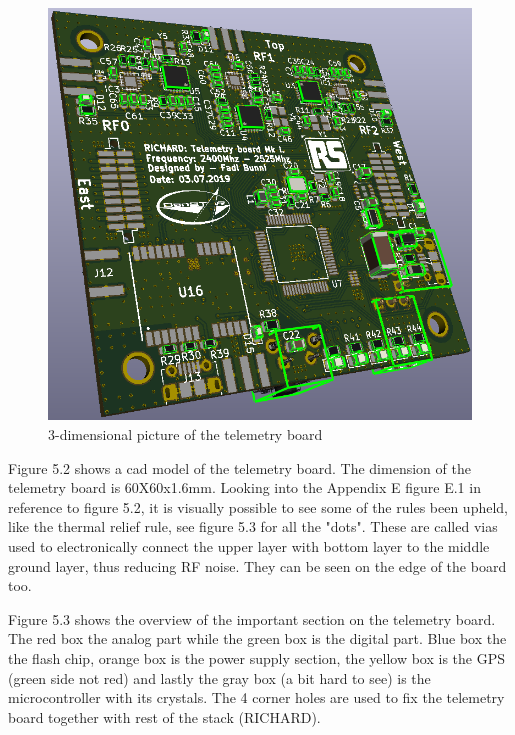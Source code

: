 \begin{figure}[h!]
\centering
\includegraphics[scale=0.8]{figures/TelemetryBoard3D.PNG}
\caption{3-dimensional picture of the telemetry board}
\end{figure}

Figure 5.2 shows a cad model of the telemetry board. The dimension of the telemetry board is 60X60x1.6mm. Looking into the Appendix E figure E.1 in reference to figure 5.2, it is visually possible to see some of the rules been upheld, like the thermal relief rule, see figure 5.3 for all the "dots". These are called vias used to electronically connect the upper layer with bottom layer to the middle ground layer, thus reducing RF noise. They can be seen on the edge of the board too.   

Figure 5.3 shows the overview of the important section on the telemetry board. The red box the analog part while the green box is the digital part. Blue box the the flash chip, orange box is the power supply section, the yellow box is the GPS (green side not red) and lastly the gray box (a bit hard to see) is the microcontroller with its crystals. The 4 corner holes are used to fix the telemetry board together with rest of the stack (RICHARD).  

